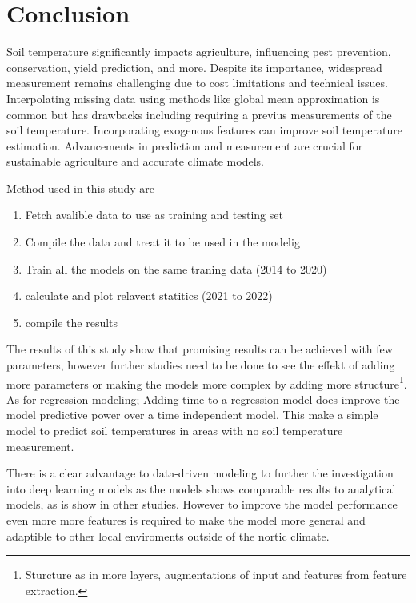 \section{Conclusion}


Soil temperature significantly impacts agriculture, influencing pest prevention, conservation, yield prediction, and more. Despite its importance, widespread measurement remains challenging due to cost limitations and technical issues. Interpolating missing data using methods like global mean approximation is common but has drawbacks including requiring a previus measurements of the soil temperature. Incorporating exogenous features can improve soil temperature estimation. Advancements in prediction and measurement are crucial for sustainable agriculture and accurate climate models.

Method used in this study are
\begin{enumerate}
	\item Fetch avalible data to use as training and testing set
	\item Compile the data and treat it to be used in the modelig
	\item Train all the models on the same traning data (2014 to 2020)
	\item calculate and plot relavent statitics (2021 to 2022)
	\item compile the results
\end{enumerate} 

The results of this study show that promising results can be achieved with few parameters, however further studies need to be done to see the effekt of adding more parameters or making the models more complex by adding more structure\footnote{Sturcture as in more layers, augmentations of input and features from feature extraction.}. As for regression modeling; Adding time to a regression model does improve the model predictive power over a time independent model. This make a simple model to predict soil temperatures in areas with no soil temperature measurement. 

There is a clear advantage to data-driven modeling to further the investigation into deep learning models as the models shows comparable results to analytical models, as is show in other studies\cite{feng_estimation_2019,li_attention-aware_2022,li_modeling_2020}. However to improve the model performance even more more features is required to make the model more general and adaptible to other local enviroments outside of the nortic climate. 


